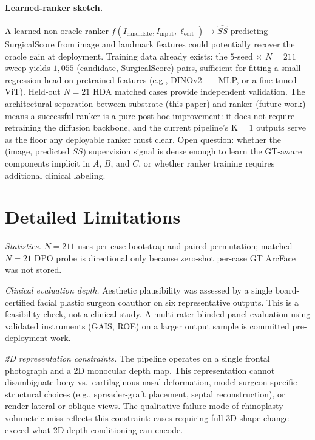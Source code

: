 \documentclass{article}
\begin{document}
\paragraph{Learned-ranker sketch.}
A learned non-oracle ranker
$f(I_{\text{candidate}}, I_{\text{input}}, \ell_{\text{edit}}) \to \widehat{SS}$
predicting SurgicalScore from image and landmark features could
potentially recover the oracle gain at deployment. Training data already
exists: the $5$-seed $\times$ $N{=}211$ sweep yields $1{,}055$
(candidate, SurgicalScore) pairs, sufficient for fitting a small
regression head on pretrained features (e.g., DINOv2~\citep{oquab2024dinov2}
$+$ MLP, or a fine-tuned ViT). Held-out $N{=}21$ HDA matched cases provide
independent validation. The architectural separation between substrate
(this paper) and ranker (future work) means a successful ranker is a pure
post-hoc improvement: it does not require retraining the diffusion
backbone, and the current pipeline's K$=1$ outputs serve as the floor any
deployable ranker must clear. Open question: whether the (image, predicted
$SS$) supervision signal is dense enough to learn the GT-aware components
implicit in $A$, $B$, and $C$, or whether ranker training requires
additional clinical labeling.

\section{Detailed Limitations}
\label{app:limitations_full}

\textit{Statistics.} $N{=}211$ uses per-case bootstrap and paired
permutation; matched $N{=}21$ DPO probe is directional only because
zero-shot per-case GT ArcFace was not stored.

\textit{Clinical evaluation depth.} Aesthetic plausibility was assessed by
a single board-certified facial plastic surgeon coauthor on six
representative outputs. This is a feasibility check, not a clinical study.
A multi-rater blinded panel evaluation using validated instruments (GAIS,
ROE) on a larger output sample is committed pre-deployment work.

\textit{2D representation constraints.} The pipeline operates on a single
frontal photograph and a 2D monocular depth map. This representation
cannot disambiguate bony vs.\ cartilaginous nasal deformation, model
surgeon-specific structural choices (e.g., spreader-graft placement,
septal reconstruction), or render lateral or oblique views. The qualitative failure mode of rhinoplasty volumetric miss reflects
this constraint: cases requiring full 3D shape change exceed what 2D
depth conditioning can encode.
\end{document}
